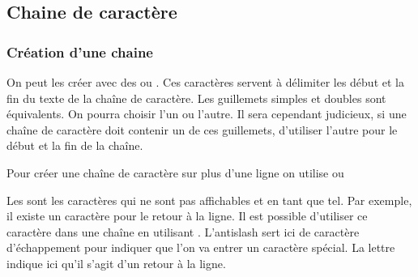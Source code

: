 \documentclass[letterpaper,10pt,english]{sphinxhowto}
\begin{document}
\subsection{Chaine de caractère}
\label{\detokenize{cours4_chaine_caractere_cours:chaine-de-caractere}}\label{\detokenize{cours4_chaine_caractere_cours::doc}}

\subsubsection{Création d’une chaine}
\label{\detokenize{cours4_chaine_caractere_cours:creation-d-une-chaine}}
\sphinxAtStartPar
On peut les créer avec des  ou .  Ces caractères servent à délimiter les
début et la fin du texte de la chaîne de caractère. Les guillemets
simples  et doubles  sont équivalents. On pourra choisir l’un ou
l’autre. Il sera cependant judicieux, si une chaîne de caractère doit contenir
un de ces guillemets, d’utiliser l’autre pour le début et la fin de la chaîne.

\begin{sphinxVerbatim}[commandchars=\\\{\}]
  
  
  
\end{sphinxVerbatim}

\sphinxAtStartPar
Pour créer une chaîne de caractère sur plus d’une ligne on utilise  ou 

\begin{sphinxVerbatim}[commandchars=\\\{\}]
  
\end{sphinxVerbatim}

\sphinxAtStartPar
Les  sont les caractères qui ne sont pas affichables et en tant que tel.
Par exemple, il existe un caractère pour le retour à la ligne. Il est possible
d’utiliser ce caractère dans une chaîne en utilisant . L’antislash sert
ici de caractère d’échappement pour indiquer que l’on va entrer un caractère
spécial. La lettre  indique ici qu’il s’agit d’un retour à la ligne.
\end{document}
